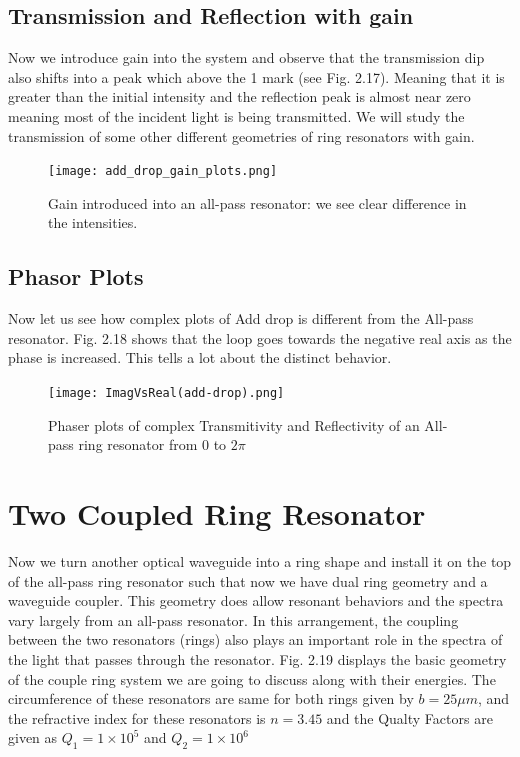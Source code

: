 \subsection{Transmission and Reflection with gain}
Now we introduce gain into the system and observe that the transmission dip also shifts into a peak which above the 1 mark (see Fig. 2.17). Meaning that it is greater than the initial intensity and the reflection peak is almost near zero meaning most of the incident light is being transmitted. We will study the transmission of some other different geometries of ring resonators with gain. 


\begin{figure}[h]
\centering
\texttt{[image: add\_drop\_gain\_plots.png]}
\caption{Gain introduced into an all-pass resonator: we see clear difference in the intensities.}
\end{figure}

\subsection{Phasor Plots}
Now let us see how complex plots of Add drop is different from the All-pass resonator. Fig. 2.18 shows that the loop goes towards the negative real axis as the phase is increased. This tells a lot about the distinct behavior.

\begin{figure}[h]
\centering
\texttt{[image: ImagVsReal(add-drop).png]}
\caption{Phaser plots of complex Transmitivity and Reflectivity of an All-pass ring resonator from 0 to $2\pi$}
\end{figure}


\section{Two Coupled Ring Resonator}
Now we turn another optical waveguide into a ring shape and install it on the top of the all-pass ring resonator such that now we have dual ring geometry and a waveguide coupler. This geometry does allow resonant behaviors and the spectra vary largely from an all-pass resonator.
In this arrangement, the coupling between the two resonators (rings) also plays an important role in the spectra of the light that passes through the resonator. Fig. 2.19 displays the basic geometry of the couple ring system we are going to discuss along with their energies. The circumference of these resonators are same for both rings given by $b = 25\mu m$, and the refractive index for these resonators is $n=3.45$ and the Qualty Factors are given as $Q_{1} = 1\times10^{5}$ and $Q_{2} = 1\times10^{6}$

